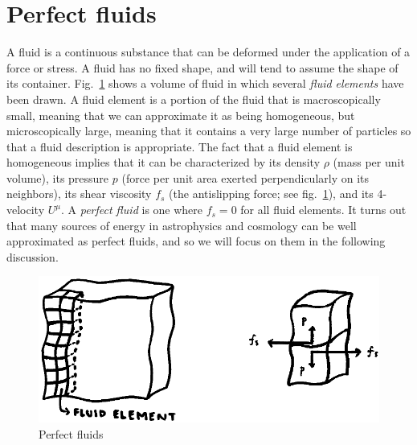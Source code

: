 \par\vspace{\baselineskip}

\section{Perfect fluids}

A fluid is a continuous substance that can be deformed under the application of a force or stress. A fluid has no fixed shape, and will tend to assume the shape of its container. Fig.\ \ref{fig:lec4_2} shows a volume of fluid in which several {\it fluid elements} have been drawn. A fluid element is a portion of the fluid that is macroscopically small, meaning that we can approximate it as being homogeneous, but microscopically large, meaning that it contains a very large number of particles so that a fluid description is appropriate. The fact that a fluid element is homogeneous implies that it can be characterized by its density $\rho$ (mass per unit volume), its pressure $p$ (force per unit area exerted perpendicularly on its neighbors), its shear viscosity $f_s$ (the antislipping force; see fig.\ \ref{fig:lec4_2}), and its 4-velocity $U^{\mu}$. A {\it perfect fluid} is one where $f_s=0$ for all fluid elements. It turns out that many sources of energy in astrophysics and cosmology can be well approximated 
as perfect fluids, and so we will focus on them in the following discussion.
\begin{figure}[ht]
\begin{center}
\includegraphics[scale=0.5]{Draw/lec4_2.png}
\end{center}
\caption{Perfect fluids}
\label{fig:lec4_2}
\end{figure}

